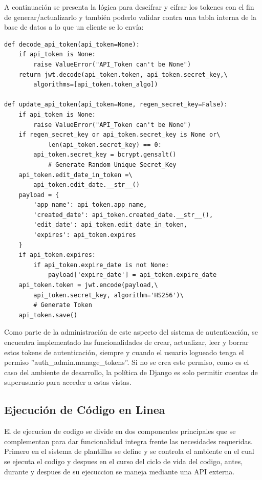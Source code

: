 A continuación se presenta la lógica para descifrar y cifrar los tokenes con el fin de generar/actualizarlo y también poderlo validar contra una tabla interna de la base de datos a lo que un cliente se lo envía:
\begin{lstlisting}
def decode_api_token(api_token=None):
    if api_token is None:
        raise ValueError("API_Token can't be None")
    return jwt.decode(api_token.token, api_token.secret_key,\
        algorithms=[api_token.token_algo])

def update_api_token(api_token=None, regen_secret_key=False):
    if api_token is None:
        raise ValueError("API_Token can't be None")
    if regen_secret_key or api_token.secret_key is None or\
            len(api_token.secret_key) == 0:
        api_token.secret_key = bcrypt.gensalt()
            # Generate Random Unique Secret_Key
    api_token.edit_date_in_token =\
        api_token.edit_date.__str__()
    payload = {
        'app_name': api_token.app_name,
        'created_date': api_token.created_date.__str__(),
        'edit_date': api_token.edit_date_in_token,
        'expires': api_token.expires
    }
    if api_token.expires:
        if api_token.expire_date is not None:
            payload['expire_date'] = api_token.expire_date
    api_token.token = jwt.encode(payload,\
        api_token.secret_key, algorithm='HS256')\
        # Generate Token
    api_token.save()
\end{lstlisting}

Como parte de la administración de este aspecto del sistema de autenticación, se encuentra implementado las funcionalidades de crear, actualizar, leer y borrar estos tokens de autenticación, siempre y cuando el usuario logueado tenga el permiso ''auth\_admin.manage\_tokens''. Si no se crea este permiso, como es el caso del ambiente de desarrollo, la política de Django es solo permitir cuentas de superusuario para acceder a estas vistas.


\subsection{Ejecución de Código en Linea}
El de ejecucion de codigo se divide en dos componentes principales que se complementan para dar funcionalidad integra frente las necesidades requeridas. Primero en el sistema de plantillas se define y se controla el ambiente en el cual se ejecuta el codigo y despues en el curso del ciclo de vida del codigo, antes, durante y despues de su ejecuccion se maneja mediante una API externa.

